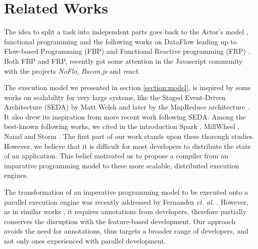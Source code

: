\section{Related Works} \label{section:related}

The idea to split a task into independent parts goes back to the Actor's model \cite{Hewitt1973a}, functional programming \cite{Hughes1989} and the following works on Data\-Flow leading up to Flow-based Programming (FBP) and Functional Reactive program\-ming  (FRP) \cite{Elliott1997}.
Both FBP and FRP, recently got some attention in the Javascript community with the projects \textit{NoFlo}, \textit{Bacon.js} and \textit{react}.

The execution model we presented in section \ref{section:model}, is inspired by some works on scalability for very large systems, like the Staged Event-Driven Architecture (SEDA) by Matt Welsh \cite{Welsh2000} and later by the MapReduce architecture \cite{Dean2008}.
It also drew its inspiration from more recent work following SEDA.
Among the best-known following works, we cited in the introduction Spark \cite{Zaharia2012}, MillWheel \cite{Akidau2013}, Naiad \cite{McSherry} and Storm \cite{Toshniwal2014}.
The first part of our work stands upon these thorough studies.
However, we believe that it is difficult for most developers to distribute the state of an application.
This belief motivated us to propose a compiler from an imparative programming model to these more scalable, distributed execution engines.


The transformation of an imperative programming model to be executed onto a parallel execution engine was recently addressed by Fernandez \textit{et. al.} \cite{Fernandez2014a}.
However, as in similar works \cite{Power2010}, it requires annotations from developers, therefore partially conserves the disruption with the feature-based development.
Our approach avoids the need for annotations, thus targets a broader range of developers, and not only ones experienced with parallel development.

